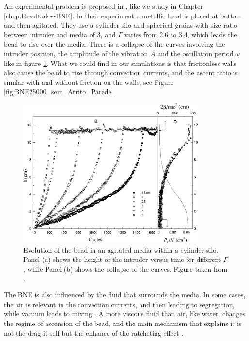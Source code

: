     An experimental problem is proposed in \cite{Inertia_in_the_Brazil_nut_problem}, like we study in Chapter \ref{chap:Resultados-BNE}. In their experiment a metallic bead is placed at bottom and then agitated. They use a cylinder silo and spherical grains with size ratio between intruder and media of 3, and $\Gamma$ varies from 2.6 to 3.4, which leads the bead to rise over the media. There is a collapse of the curves involving the intruder position, the amplitude of the vibration $A$ and the oscillation period $\omega$ like in figure \ref{fig:BNE_molinari}. What we could find in our simulations is that frictionless walls also cause the bead to rise through convection currents, and the ascent ratio is similar with and without friction on the walls, see Figure \ref{fig:BNE25000_sem_Atrito_Parede}.

\begin{figure}[H]
    \centering
    \includegraphics[width=0.85\textwidth]{04-figuras/BNE_Molinari.png}
    \caption[Intruder height in an agitated media.]{Evolution of the bead in an agitated media within a cylinder silo. Panel (a) shows the height of the intruder versus time for different $\Gamma$, while Panel (b) shows the collapse of the curves. Figure taken from \cite{Inertia_in_the_Brazil_nut_problem}.}
    \label{fig:BNE_molinari}
\end{figure}

    The BNE is also influenced by the fluid that surrounds the media. In some cases, the air is relevant in the convection currents, and then leading to segregation, while vacuum leads to mixing \cite{Brazil-Nut_effect_Size_separation_of_granular_particles, Inertia_in_the_Brazil_nut_problem}. A more viscous fluid than air, like water, changes the regime of ascension of the bead, and the main mechanism that explains it is not the drag it self but the enhance of the ratcheting effect \cite{The_water-enhance_Brazil_nut_effect}.

